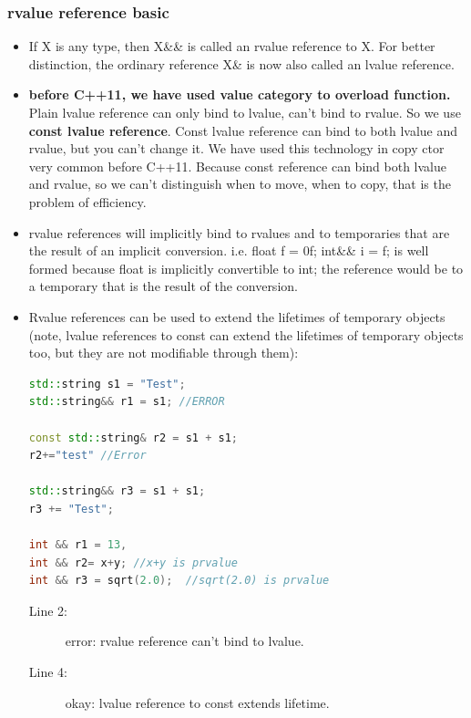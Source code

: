 \documentclass[a4paper,11pt,twoside]{book}
\begin{document}
\subsubsection{rvalue reference basic}
\begin{itemize}
	\item If X is any type, then X\&\& is called an rvalue reference to X. For better distinction, the ordinary reference X\& is now also called an lvalue reference.
	
	\item \textbf{before C++11, we have used value category to overload function.} Plain lvalue reference can only bind to lvalue, can't bind to rvalue. So we use \textbf{const lvalue reference}.  Const lvalue reference can bind to both lvalue and rvalue, but you can't change it. We have used this technology in copy ctor very common before C++11. Because const reference can bind both lvalue and rvalue, so we can't distinguish when to move, when to copy, that is the problem of efficiency.
	
	\item rvalue references will implicitly bind to rvalues and to temporaries that are the result of an implicit conversion. i.e. float f = 0f; int\&\& i = f; is well formed because float is implicitly convertible to int; the reference would be to a temporary that is the result of the conversion.
	
	\item Rvalue references can be used to extend the lifetimes of temporary objects (note, lvalue references to const can extend the lifetimes of temporary objects too, but they are not modifiable through them):
	
\begin{lstlisting}[frame=single, language=c++, mathescape=true]
std::string s1 = "Test";
std::string&& r1 = s1; //ERROR
		
const std::string& r2 = s1 + s1; 
r2+="test" //Error
		
std::string&& r3 = s1 + s1;      
r3 += "Test";                    

int && r1 = 13,  
int && r2= x+y; //x+y is prvalue
int && r3 = sqrt(2.0);  //sqrt(2.0) is prvalue

\end{lstlisting}
	\begin{description}
		\item[Line 2:]  error: rvalue reference can't bind to lvalue.
		
		\item[Line 4:] okay: lvalue reference to const extends lifetime.
		

\end{description}
\end{itemize}
\end{document}
